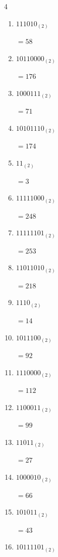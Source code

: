 \begin{multicols}{4}
\begin{enumerate}
        $=104$

  \item $111010_{(2)}$

        $=58$

  \item $10110000_{(2)}$

        $=176$

  \item $1000111_{(2)}$

        $=71$

  \item $10101110_{(2)}$

        $=174$

\columnbreak %

  \item $11_{(2)}$

        $=3$

  \item $11111000_{(2)}$

        $=248$

  \item $11111101_{(2)}$

        $=253$

  \item $11011010_{(2)}$

        $=218$

  \item $1110_{(2)}$

        $=14$

  \item $1011100_{(2)}$

        $=92$

  \item $1110000_{(2)}$

        $=112$

  \item $1100011_{(2)}$

        $=99$

  \item $11011_{(2)}$

        $=27$

  \item $1000010_{(2)}$

        $=66$

  \item $101011_{(2)}$

        $=43$

  \item $10111101_{(2)}$


\end{enumerate}
\end{multicols}
